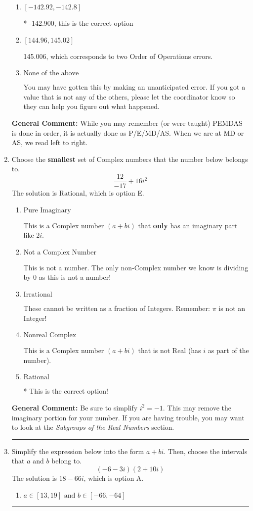 \documentclass{extbook}[14pt]
\newcommand{\litem}[1]{\item #1

\rule{\textwidth}{0.4pt}}
\begin{document}
\begin{enumerate}
{\begin{enumerate}[label=\Alph*.]
 145.100, which corresponds to an Order of Operations error: multiplying by negative before squaring. For example: $(-3)^2 \neq -3^2$
\item \( [-142.92, -142.8] \)

* -142.900, this is the correct option
\item \( [144.96, 145.02] \)

 145.006, which corresponds to two Order of Operations errors.
\item \( \text{None of the above} \)

 You may have gotten this by making an unanticipated error. If you got a value that is not any of the others, please let the coordinator know so they can help you figure out what happened.
\end{enumerate}

\textbf{General Comment:} While you may remember (or were taught) PEMDAS is done in order, it is actually done as P/E/MD/AS. When we are at MD or AS, we read left to right.
}
\litem{
Choose the \textbf{smallest} set of Complex numbers that the number below belongs to.
\[ \frac{12}{-17}+16i^2 \]The solution is \( \text{Rational} \), which is option E.\begin{enumerate}[label=\Alph*.]
\item \( \text{Pure Imaginary} \)

This is a Complex number $(a+bi)$ that \textbf{only} has an imaginary part like $2i$.
\item \( \text{Not a Complex Number} \)

This is not a number. The only non-Complex number we know is dividing by 0 as this is not a number!
\item \( \text{Irrational} \)

These cannot be written as a fraction of Integers. Remember: $\pi$ is not an Integer!
\item \( \text{Nonreal Complex} \)

This is a Complex number $(a+bi)$ that is not Real (has $i$ as part of the number).
\item \( \text{Rational} \)

* This is the correct option!
\end{enumerate}

\textbf{General Comment:} Be sure to simplify $i^2 = -1$. This may remove the imaginary portion for your number. If you are having trouble, you may want to look at the \textit{Subgroups of the Real Numbers} section.
}
\litem{
Simplify the expression below into the form $a+bi$. Then, choose the intervals that $a$ and $b$ belong to.
\[ (-6 - 3 i)(2 + 10 i) \]The solution is \( 18 - 66 i \), which is option A.\begin{enumerate}[label=\Alph*.]
\item \( a \in [13, 19] \text{ and } b \in [-66, -64] \)


\end{enumerate}}
\end{enumerate}
\end{document}
